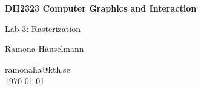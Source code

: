 \begin{titlepage}
\begin{center}
	\vspace{3em}	
    {\Huge\bfseries DH2323 Computer Graphics and Interaction\par}
    \vspace{2em}
    {\huge Lab 3: Rasterization \par}
    \vspace{3em}
    {\Large Ramona Häuselmann\par}
	\vspace{1em}
    ramonaha@kth.se\\
	\vspace{1em}
    \today
\end{center}
\end{titlepage}